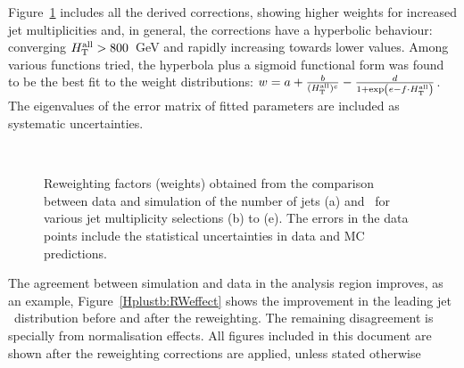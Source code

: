 Figure~\ref{Hplustb:RWfactors} includes all the derived corrections, showing higher weights for increased jet multiplicities and, in general, the \HTall corrections have a hyperbolic behaviour: converging $H_{\text{T}}^{\text{all}} > 800$~GeV and rapidly increasing towards lower values. Among various functions tried, the hyperbola plus a sigmoid functional form was found to be the best fit to the \HTall weight distributions: $w=a+\frac{b}{(H_{\text{T}}^{\text{all}})^c} - \frac{d}{1+\exp(e-f\cdot H_{\text{T}}^{\text{all}})}$. The eigenvalues of the error matrix of fitted parameters are included as systematic uncertainties. 

\begin{figure}[htb]
    \RawFloats
    \begin{center}
      \\
    \caption{Reweighting factors (weights) obtained from the comparison between data and simulation of the number of jets (a) and \HTall\ for various jet multiplicity selections (b) to (e).
    The errors in the data points include the statistical uncertainties in data and MC predictions.}
    \label{Hplustb:RWfactors}
\end{center}
\end{figure}

The agreement between simulation and data in the analysis region improves, as an example, Figure~\ref{Hplustb:RWeffect} shows the improvement in the leading jet \pT\ distribution before and after the reweighting. The remaining disagreement is specially from normalisation effects. All figures included in this document are shown after the reweighting corrections are applied, unless stated otherwise

